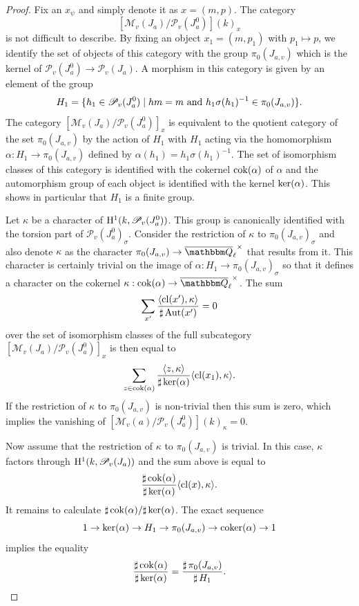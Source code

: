 \documentclass[12pt,english]{smfart}
\numberwithin{equation}{subsection}
\theoremstyle{remark}
\newcommand\calP{{\mathscr P}}
\newcommand\calM{{\mathscr M}}
\newcommand\QQ{{\mathbbm Q}}
\newcommand\rmH{{\rm H}}
\newcommand\Aut{{\rm Aut}}
\newcommand\cl{{\rm cl}}
\newcommand\Ql{{\overline\QQ_\ell}}
\begin{document}
\begin{proof}
Fix an $x_\psi$ and simply denote it as $x=(m,p)$. The category
$$[\calM_v(J_a)/\calP_v(J_a^0)](k)_{x}$$
is not difficult to describe. By fixing an object $x_1=(m,p_1)$ with $p_1
\mapsto p$, we identify the set of objects of this category with the
group $\pi_0(J_{a,v})$ which is the kernel of $\calP_v(J_a^0)\rightarrow
\calP_v(J_a)$. A morphism in this category is given by an
element of the group
$$H_1=\{h_1\in  \calP_v(J_a^0) \mid hm=m \ {\rm and}\ h_1 \sigma(h_1)^{-1} \in \pi_0(J_{a,v})\}.$$
The category $[\calM_v(J_a)/\calP_v(J_a^0)]_x$ is equivalent to the
quotient category of the set $\pi_0(J_{a,v})$ by the action of $H_1$
with $H_1$ acting via the homomorphism $\alpha:H_1\rightarrow
\pi_0(J_{a,v})$ defined by $\alpha(h_1)=h_1 \sigma(h_1)^{-1}$. The set
of isomorphism classes of this category is identified with the cokernel
${\rm cok}(\alpha)$ of $\alpha$ and the automorphism group of each
object is identified with the kernel ${\rm ker}(\alpha)$. This shows in
particular that $H_1$ is a finite group.

Let $\kappa$ be a character of $\rmH^1(k,\calP_v(J_a^0))$. This group
is canonically identified with the torsion part of $\calP_v(J_a^0)_\sigma$.
Consider the restriction of $\kappa$ to $\pi_0(J_{a,v})_\sigma$ and
also denote $\kappa$ as the character $\pi_0(J_{a,v})\rightarrow \Ql^\times$
that results from it. This character is certainly trivial on the image of
$\alpha:H_1 \rightarrow \pi_0(J_{a,v})_\sigma$ so that it defines a
character on the cokernel $\kappa: {\rm cok}(\alpha)\rightarrow
\Ql^\times$. The sum
$$\sum_{x'} \frac{\langle \cl(x'),\kappa \rangle}
{{\sharp\,} \Aut(x')}=0
$$
over the set of isomorphism classes of the full subcategory
$[\calM_v(J_a)/\calP_v(J_a^0)]_x$ is then equal to
$$
\sum_{z\in {\rm cok}(\alpha)}\frac{\langle z,\kappa \rangle}{{\sharp\,} {\rm
ker}(\alpha)}\langle \cl(x_1),\kappa \rangle.
$$
If the restriction of $\kappa$ to $\pi_0(J_{a,v})$ is non-trivial then this
sum is zero, which implies the vanishing of
$[\calM_v(a)/\calP_v(J_a^0)](k)_\kappa=0$.

Now assume that the restriction of $\kappa$ to $\pi_0(J_{a,v})$
is trivial. In this case, $\kappa$ factors through $\rmH^1(k,\calP_v(J_a))$
and the sum above is equal to
$$
\frac{{\sharp\,} {\rm cok}(\alpha)}{{\sharp\,} {\rm ker}(\alpha)} \langle \cl(x),\kappa
\rangle.
$$
It remains to calculate ${{\sharp\,} {\rm cok}(\alpha) / {\sharp\,} {\rm
ker}(\alpha)}$. The exact sequence
$$
1\rightarrow {\rm ker}(\alpha) \rightarrow H_1 \rightarrow
\pi_0(J_{a,v}) \rightarrow {\rm coker}(\alpha) \rightarrow  1
$$
implies the equality
$$\frac{{\sharp\,} {\rm cok}(\alpha)}{{\sharp\,} {\rm ker}(\alpha)} =
\frac{{\sharp\,}\pi_0(J_{a,v})}{{\sharp\,} H_1}.$$


\end{proof}
\end{document}
